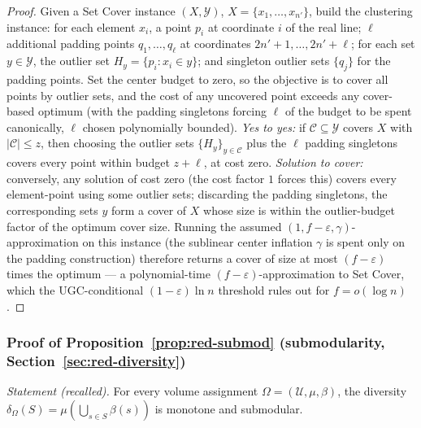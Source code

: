 \begin{proof}
Given a Set Cover instance $(X, \mathcal{Y})$, $X = \{x_1, \dots, x_{n'}\}$, build the
clustering instance: for each element $x_i$, a point $p_i$ at coordinate $i$ of the
real line; $\ell$ additional padding points $q_1, \dots, q_\ell$ at coordinates
$2n' + 1, \dots, 2n' + \ell$; for each set $y \in \mathcal{Y}$, the outlier set
$H_y = \{p_i : x_i \in y\}$; and singleton outlier sets $\{q_j\}$ for the padding
points. Set the center budget to zero, so the objective is to cover all points by
outlier sets, and the cost of any uncovered point exceeds any cover-based optimum
(with the padding singletons forcing $\ell$ of the budget to be spent
canonically, $\ell$ chosen polynomially bounded).
\emph{Yes to yes:} if $\mathcal{C} \subseteq \mathcal{Y}$ covers $X$ with
$|\mathcal{C}| \le z$, then choosing the outlier sets $\{H_y\}_{y \in \mathcal{C}}$
plus the $\ell$ padding singletons covers every point within budget $z + \ell$, at
cost zero. \emph{Solution to cover:} conversely, any solution of cost zero (the cost
factor $1$ forces this) covers every element-point using some outlier sets; discarding
the padding singletons, the corresponding sets $y$ form a cover of $X$ whose size is
within the outlier-budget factor of the optimum cover size. Running the assumed
$(1, f - \varepsilon, \gamma)$-approximation on this instance (the sublinear center
inflation $\gamma$ is spent only on the padding construction) therefore returns a
cover of size at most $(f - \varepsilon)$ times the optimum --- a polynomial-time
$(f - \varepsilon)$-approximation to Set Cover, which the UGC-conditional
$(1-\varepsilon)\ln n$ threshold rules out for $f = o(\log n)$.
\end{proof}

\subsubsection*{Proof of Proposition~\ref{prop:red-submod} (submodularity,
Section~\ref{sec:red-diversity})}
{\itshape Statement (recalled).} For every volume assignment $\Omega = (\mathcal{U},
\mu, \beta)$, the diversity $\delta_\Omega(S) = \mu(\bigcup_{s \in S} \beta(s))$ is
monotone and submodular.\eop

